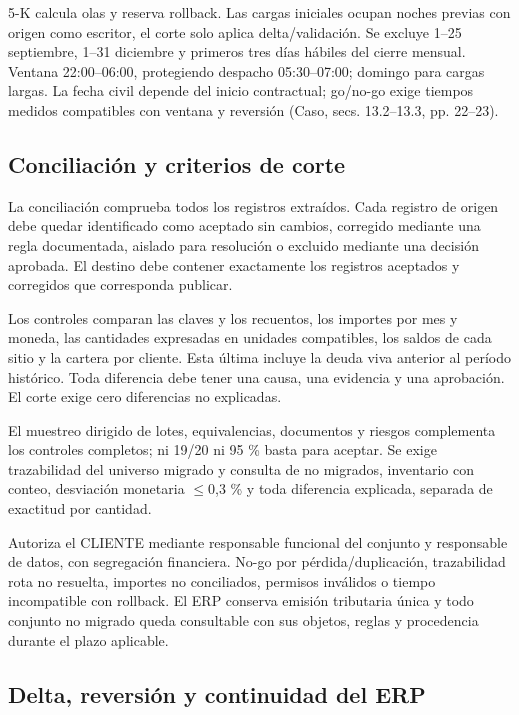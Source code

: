 5-K calcula olas y reserva rollback. Las cargas iniciales ocupan noches previas con origen como escritor, el corte solo aplica delta/validación. Se excluye 1–25 septiembre, 1–31 diciembre y primeros tres días hábiles del cierre mensual. Ventana 22:00–06:00, protegiendo despacho 05:30–07:00; domingo para cargas largas. La fecha civil depende del inicio contractual; go/no-go exige tiempos medidos compatibles con ventana y reversión (Caso, secs. 13.2–13.3, pp. 22–23).

\subsection{Conciliación y criterios de corte}
\label{sec:sd5-5-3-5}

La conciliación comprueba todos los registros extraídos. Cada registro de origen debe quedar identificado como aceptado sin cambios, corregido mediante una regla documentada, aislado para resolución o excluido mediante una decisión aprobada. El destino debe contener exactamente los registros aceptados y corregidos que corresponda publicar.

Los controles comparan las claves y los recuentos, los importes por mes y moneda, las cantidades expresadas en unidades compatibles, los saldos de cada sitio y la cartera por cliente. Esta última incluye la deuda viva anterior al período histórico. Toda diferencia debe tener una causa, una evidencia y una aprobación. El corte exige cero diferencias no explicadas.

El muestreo dirigido de lotes, equivalencias, documentos y riesgos complementa los controles completos; ni 19/20 ni 95 \% basta para aceptar. Se exige trazabilidad del universo migrado y consulta de no migrados, inventario con conteo, desviación monetaria \ensuremath{\leq}0,3 \% y toda diferencia explicada, separada de exactitud por cantidad.

Autoriza el CLIENTE mediante responsable funcional del conjunto y responsable de datos, con segregación financiera. No-go por pérdida/duplicación, trazabilidad rota no resuelta, importes no conciliados, permisos inválidos o tiempo incompatible con rollback. El ERP conserva emisión tributaria única y todo conjunto no migrado queda consultable con sus objetos, reglas y procedencia durante el plazo aplicable.

\subsection{Delta, reversión y continuidad del ERP}
\label{sec:sd5-5-3-6}

